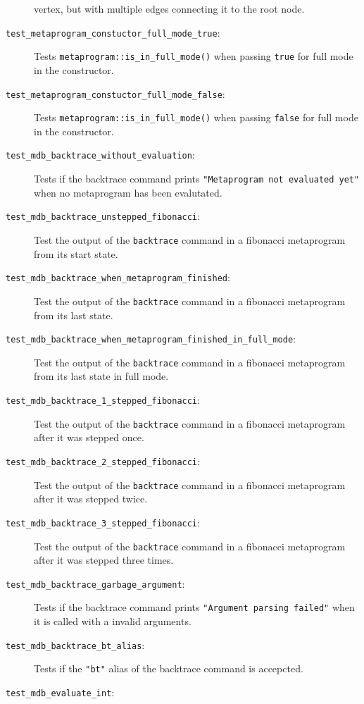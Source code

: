 \begin{description}
        vertex, but with multiple edges connecting it to the root node.
    \item[\texttt{test\_metaprogram\_constuctor\_full\_mode\_true}:]
        Tests \texttt{metaprogram::is\_in\_full\_mode()} when passing
        \texttt{true} for full mode in the constructor.
    \item[\texttt{test\_metaprogram\_constuctor\_full\_mode\_false}:]
        Tests \texttt{metaprogram::is\_in\_full\_mode()} when passing
        \texttt{false} for full mode in the constructor.
    \item[\texttt{test\_mdb\_backtrace\_without\_evaluation}:]
        Tests if the backtrace command prints
        \texttt{"Metaprogram not evaluated yet"} when no metaprogram has been
        evalutated.
    \item[\texttt{test\_mdb\_backtrace\_unstepped\_fibonacci}:]
        Test the output of the \texttt{backtrace} command in a fibonacci
        metaprogram from its start state.
    \item[\texttt{test\_mdb\_backtrace\_when\_metaprogram\_finished}:]
        Test the output of the \texttt{backtrace} command in a fibonacci
        metaprogram from its last state.
    \item[\texttt{test\_mdb\_backtrace\_when\_metaprogram\_finished\_in\_full\_mode}:]
        Test the output of the \texttt{backtrace} command in a fibonacci
        metaprogram from its last state in full mode.
    \item[\texttt{test\_mdb\_backtrace\_1\_stepped\_fibonacci}:]
        Test the output of the \texttt{backtrace} command in a fibonacci
        metaprogram after it was stepped once.
    \item[\texttt{test\_mdb\_backtrace\_2\_stepped\_fibonacci}:]
        Test the output of the \texttt{backtrace} command in a fibonacci
        metaprogram after it was stepped twice.
    \item[\texttt{test\_mdb\_backtrace\_3\_stepped\_fibonacci}:]
        Test the output of the \texttt{backtrace} command in a fibonacci
        metaprogram after it was stepped three times.
    \item[\texttt{test\_mdb\_backtrace\_garbage\_argument}:]
        Tests if the backtrace command prints
        \texttt{"Argument parsing failed"} when it is called with a invalid
        arguments.
    \item[\texttt{test\_mdb\_backtrace\_bt\_alias}:]
        Tests if the \texttt{"bt"} alias of the backtrace command is
        accepcted.
    \item[\texttt{test\_mdb\_evaluate\_int}:]

\end{description}
